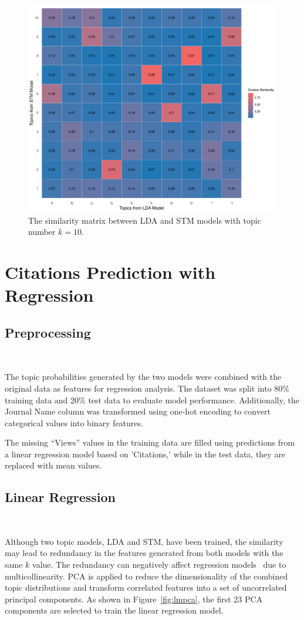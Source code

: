 \documentclass[9pt,twocolumn,twoside]{pnas-new}
\begin{document}
\begin{figure}[!tbhp]
\centering
\includegraphics[width=0.6\linewidth]{bag_words/simularity_matrix.png}
\caption{The similarity matrix between LDA and STM models with topic number $k = 10$.}
\label{fig:similarity}
\end{figure}


\section*{Citations Prediction with Regression}

\subsection*{Preprocessing} \

The topic probabilities generated by the two models were combined with the original data as features for regression analysis. The dataset was split into 80\% training data and 20\% test data to evaluate model performance. Additionally, the Journal Name column was transformed using one-hot encoding to convert categorical values into binary features.

The missing ``Views'' values in the training data are filled using predictions from a linear regression model based on 'Citations,' while in the test data, they are replaced with mean values.

\subsection*{Linear Regression} \

Although two topic models, LDA and STM, have been trained, the similarity may lead to redundancy in the features generated from both models with the same $k$ value. The redundancy can negatively affect regression models~\cite{lm} due to multicollinearity. PCA is applied to reduce the dimensionality of the combined topic distributions and transform correlated features into a set of uncorrelated principal components. As shown in Figure~\ref{fig:lmpca}, the first 23 PCA components are selected to train the linear regression model.
\end{document}
